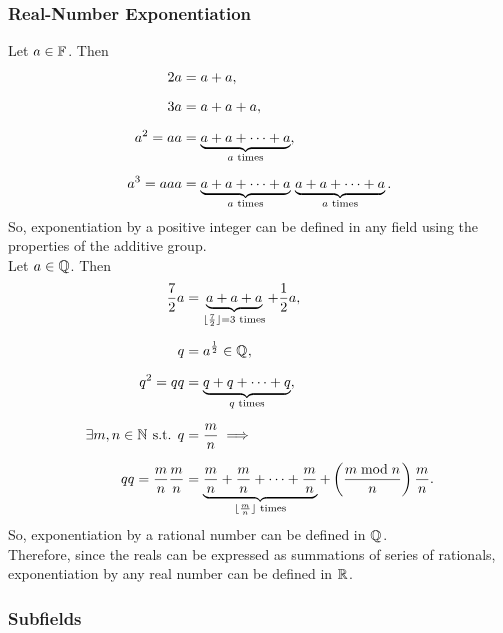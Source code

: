 \documentclass[../MathsNotesBase.tex]{subfiles}
\begin{document}
{		
		\biggerskip
		\subsubsection{Real-Number Exponentiation}\label{sssection:real-number-exponentiation}
		
		\bigskip
		Let ${ a \in \mathbb{F}^{} }$. Then
		\[\begin{aligned}
			2a &= a + a, \nn
			3a &= a + a + a, \nn
			a^2 = aa &= \underbrace{a + a + \cdots + a}_{a \text{ times}}, \nn
			a^3 = aaa &= \underbrace{a + a + \cdots + a}_{a \text{ times}} \, \underbrace{a + a + \cdots + a}_{a \text{ times}}.
		\end{aligned}\]
		So, exponentiation by a positive integer can be defined in any field using the properties of the additive group.\\
		
		Let ${ a \in \mathbb{Q}^{} }$. Then
		\[\begin{aligned}
			\frac{7}{2} a &= \underbrace{a + a + a}_{\floor{\frac{7}{2}} = 3 \text{ times}} + \frac{1}{2} a, \nn
			q &= a^{\frac{1}{2}} \in \Q{}, \nn
			q^2 = qq &= \underbrace{q + q + \cdots + q}_{q \text{ times}}, \nn
			\exists m,n \in \N{} \suchthat q &= \frac{m}{n} \implies \nn
			qq = \frac{m}{n}\frac{m}{n} &= \underbrace{\frac{m}{n} + \frac{m}{n} + \cdots + \frac{m}{n}}_{\floor{\frac{m}{n}} \text{ times}} + \left(\frac{m \bmod n}{n}\right) \frac{m}{n}.
		\end{aligned}\]
		So, exponentiation by a rational number can be defined in $\mathbb{Q}^{}$.\\
		
		Therefore, since the reals can be expressed as summations of series of rationals, exponentiation by any real number can be defined in $\mathbb{R}^{}$.
		
		\biggerskip
		\subsubsection{Subfields}
		
}
\end{document}
